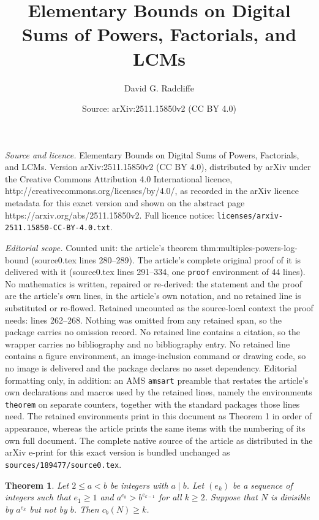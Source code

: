 \documentclass[10pt,a4paper]{amsart}
\title{Elementary Bounds on Digital Sums of Powers, Factorials, and LCMs}
\author{David G. Radcliffe}
\date{Source: arXiv:2511.15850v2 (CC BY 4.0)}
\newtheorem{theorem}{Theorem}
\begin{document}
\maketitle

\noindent\emph{Source and licence.} Elementary Bounds on Digital Sums of Powers, Factorials, and LCMs. Version arXiv:2511.15850v2 (CC BY 4.0), distributed by arXiv under the Creative Commons Attribution 4.0 International licence, http://creativecommons.org/licenses/by/4.0/, as recorded in the arXiv licence metadata for this exact version and shown on the abstract page https://arxiv.org/abs/2511.15850v2. Full licence notice: \texttt{licenses/arxiv-2511.15850-CC-BY-4.0.txt}.\par\smallskip

\noindent\textit{Editorial scope.} Counted unit: the article's theorem thm:multiples-powers-log-bound (source0.tex lines 280--289). The article's complete original proof of it is delivered with it (source0.tex lines 291--334, one \texttt{proof} environment of 44 lines). No mathematics is written, repaired or re-derived: the statement and the proof are the article's own lines, in the article's own notation, and no retained line is substituted or re-flowed.  Retained uncounted as the source-local context the proof needs: lines 262--268.  Nothing was omitted from any retained span, so the package carries no omission record.  No retained line contains a citation, so the wrapper carries no bibliography and no bibliography entry.  No retained line contains a figure environment, an image-inclusion command or drawing code, so no image is delivered and the package declares no asset dependency.  Editorial formatting only, in addition: an AMS \texttt{amsart} preamble that restates the article's own declarations and macros used by the retained lines, namely the environments \texttt{theorem} on separate counters, together with the standard packages those lines need.  The retained environments print in this document as Theorem 1 in order of appearance, whereas the article prints the same items with the numbering of its own full document.  The complete native source of the article as distributed in the arXiv e-print for this exact version is bundled unchanged as \texttt{sources/189477/source0.tex}.
\begin{theorem} \label{thm:multiples-of-powers}
    Let $2 \le a < b$ be integers with $a \mid b$.
    Let $(e_{k})$ be a sequence of integers such that $e_{1} \ge 1$ and
    $a^{e_{k}} > b^{e_{k-1}}$ for all $k \ge 2$.
    Suppose that $N$ is divisible by $a^{e_{k}}$ but not by $b$.
    Then $c_b(N) \ge k$.
\end{theorem}
\end{document}
